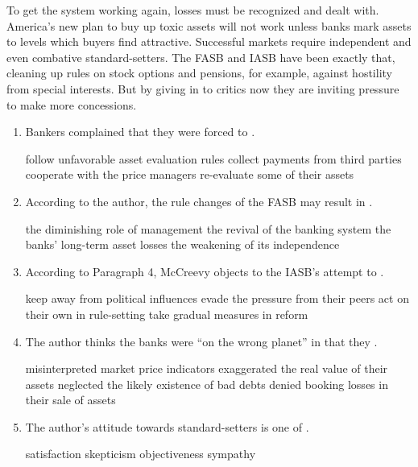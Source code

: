 To get the system working again, losses must be recognized and dealt
with. America's new plan to buy up toxic assets will not work unless
banks mark assets to levels which buyers find attractive. Successful
markets require independent and even combative standard-setters. The
FASB and IASB have been exactly that, cleaning up rules on stock options
and pensions, for example, against hostility from special interests. But
by giving in to critics now they are inviting pressure to make more
concessions.

\begin{enumerate}[resume]
	\item
Bankers complained that they were forced to \lineread.


\fourchoices
{follow unfavorable asset evaluation rules}
{collect payments from third parties}
{cooperate with the price managers}
{re-evaluate some of their assets}



\item
According to the author, the rule changes of the FASB may
result in \lineread.


\fourchoices
{the diminishing role of management}
{the revival of the banking system}
{the banks' long-term asset losses}
{the weakening of its independence}


\item
According to Paragraph 4, McCreevy objects to the IASB's
attempt to \lineread.


\fourchoices
{keep away from political influences}
{evade the pressure from their peers}
{act on their own in rule-setting}
{take gradual measures in reform}



\item
The author thinks the banks were ``on the wrong planet'' in
that they \lineread.


\fourchoices
{misinterpreted market price indicators}
{exaggerated the real value of their assets}
{neglected the likely existence of bad debts}
{denied booking losses in their sale of assets}



\item
The author's attitude towards standard-setters is one of \lineread.


\fourchoices
{satisfaction}
{skepticism}
{objectiveness}
{sympathy}


\end{enumerate}


